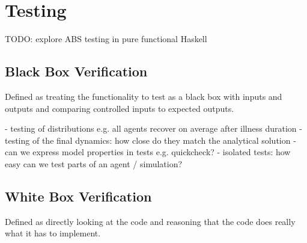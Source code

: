 \section{Testing}
TODO: explore ABS testing in pure functional Haskell


\subsection{Black Box Verification}
Defined as treating the functionality to test as a black box with inputs and outputs and comparing controlled inputs to expected outputs.

- testing of distributions e.g. all agents recover on average after illness duration
- testing of the final dynamics: how close do they match the analytical solution
- can we express model properties in tests e.g. quickcheck?
- isolated tests: how easy can we test parts of an agent / simulation?

\subsection{White Box Verification}
Defined as directly looking at the code and reasoning that the code does really what it has to implement.